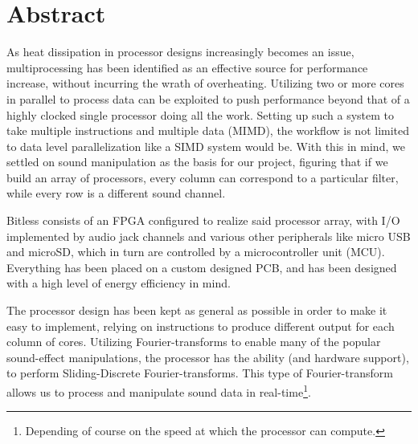 \section*{Abstract}
As heat dissipation in processor designs increasingly becomes an issue,
multiprocessing has been identified as an effective source for performance
increase, without incurring the wrath of overheating. Utilizing two or more
cores in parallel to process data can be exploited to push performance beyond
that of a highly clocked single processor doing all the work. Setting up such
a system to take multiple instructions and multiple data (MIMD), the workflow
is not limited to data level parallelization like a SIMD system would be. With
this in mind, we settled on sound manipulation as the basis for our project,
figuring that if we build an array of processors, every column can correspond
to a particular filter, while every row is a different sound channel.
\newline

Bitless consists of an FPGA configured to realize said processor array, with
I/O implemented by audio jack channels and various other peripherals like micro
USB and microSD, which in turn are controlled by a microcontroller unit (MCU).
Everything has been placed on a custom designed PCB, and has been designed with
a high level of energy efficiency in mind.
\newline

The processor design has been kept as general as possible in order to make it
easy to implement, relying on instructions to produce different output for each
column of cores. Utilizing Fourier-transforms to enable many of the popular
sound-effect manipulations, the processor has the ability (and hardware
support), to perform Sliding-Discrete Fourier-transforms. This type of
Fourier-transform allows us to process and manipulate sound data in
real-time\footnote{Depending of course on the speed at
which the processor can compute.}.
\newline

